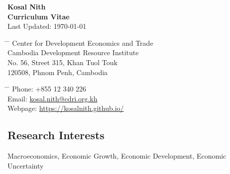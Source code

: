 \documentclass[10pt,a4paper]{article}
\begin{document}

\begin{center}
	\Large{\textbf{Kosal Nith}}\\
	\large{\textbf{Curriculum Vitae}\\
	\normalsize Last Updated:	\today}
\end{center}

\parbox{0.5\textwidth}{ %
	\begin{tabbing} %
		\hspace{3cm} \= \hspace{4cm} \= \kill %
		Center for Development Economics and Trade \\
		Cambodia Development Resource Institute\\ 
		No. 56, Street 315, Khan Tuol Touk \\
		120508, Phnom Penh, Cambodia
		
		
\end{tabbing}}
\hfill %
\parbox{0.5\textwidth}{ %
	\begin{tabbing} %
		\hspace{3cm} \= \hspace{4cm} \= \kill %
		Phone: +855 12 340 226 \\ 
		Email: \href{mailto:kosal.nith@cdri.org.kh}{kosal.nith@cdri.org.kh}\\
		Webpage: \href{https://kosalnith.github.io/}{https://kosalnith.github.io/}  
\end{tabbing}}
\vspace{-1em}

\subsection*{Research Interests}	

	Macroeconomics, Economic Growth, Economic Development, Economic Uncertainty
\end{document}
